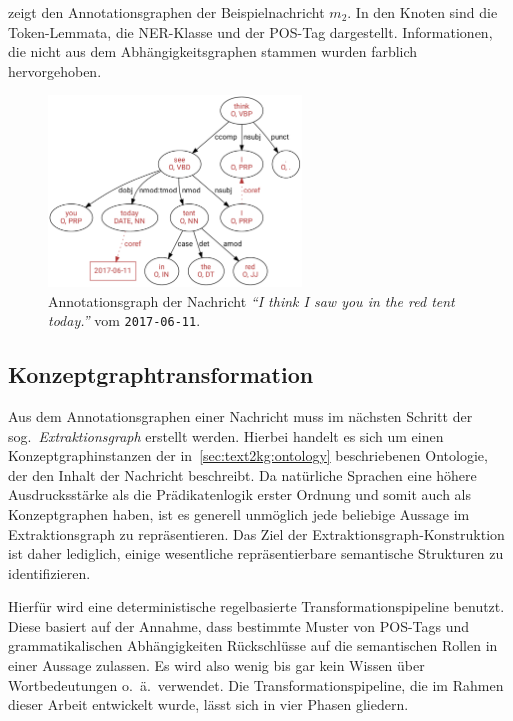 zeigt den Annotationsgraphen der Beispielnachricht $m_2$.
In den Knoten sind die Token-Lemmata, die NER-Klasse und der POS-Tag dargestellt.
Informationen, die nicht aus dem Abhängigkeitsgraphen stammen wurden farblich hervorgehoben.
\begin{figure}[h]
	\centering
	\includegraphics[width=0.6\textwidth]{gfx/text2kg/annotationGraph1.pdf}
	\caption{Annotationsgraph der Nachricht \textit{``I think I saw you in the red tent today.''} vom \texttt{2017-06-11}.}\label{fig:text2kg:annotationGraph1} %
\end{figure}

\subsection{Konzeptgraphtransformation}%
\label{sec:text2kg:nlp:transform}

Aus dem Annotationsgraphen einer Nachricht muss im nächsten Schritt der sog.\ \textit{Extraktionsgraph} erstellt werden.
Hierbei handelt es sich um einen Konzeptgraphinstanzen der in~\ref{sec:text2kg:ontology} beschriebenen Ontologie, der den Inhalt der Nachricht beschreibt.
Da natürliche Sprachen eine höhere Ausdrucksstärke als die Prädikatenlogik erster Ordnung und somit auch als Konzeptgraphen haben, ist es generell unmöglich jede beliebige Aussage im Extraktionsgraph zu repräsentieren.
Das Ziel der Extraktionsgraph-Konstruktion ist daher lediglich, einige wesentliche repräsentierbare semantische Strukturen zu identifizieren.

Hierfür wird eine deterministische regelbasierte Transformationspipeline benutzt.
Diese basiert auf der Annahme, dass bestimmte Muster von POS-Tags und grammatikalischen Abhängigkeiten Rückschlüsse auf die semantischen Rollen in einer Aussage zulassen.
Es wird also wenig bis gar kein Wissen über Wortbedeutungen o.~ä.\ verwendet.
Die Transformationspipeline, die im Rahmen dieser Arbeit entwickelt wurde, lässt sich in vier Phasen gliedern.


